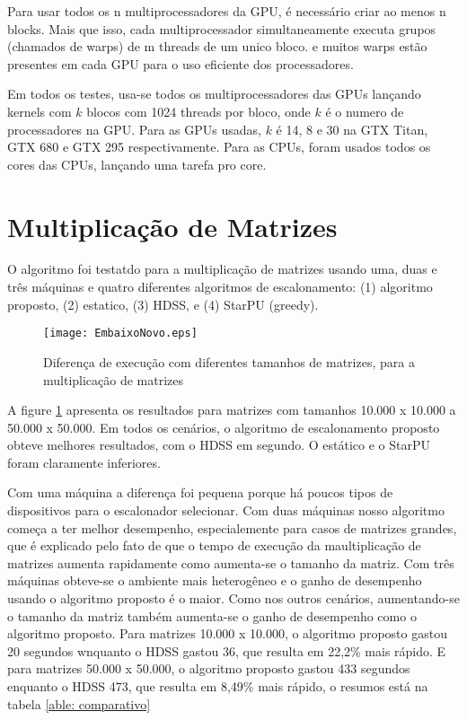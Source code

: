 Para usar todos os n multiprocessadores da GPU, é necessário criar ao menos n blocks. Mais que isso, cada multiprocessador simultaneamente executa grupos (chamados de warps) de m threads de um unico bloco. e muitos warps estão presentes em cada GPU para o uso eficiente dos processadores.

Em todos os testes, usa-se todos os multiprocessadores das GPUs lançando kernels com $k$ blocos com 1024 threads por bloco, onde $k$ é o numero de processadores na GPU. Para as GPUs usadas, $k$ é 14, 8 e 30 na GTX Titan, GTX 680 e GTX 295 respectivamente. Para as CPUs, foram usados todos os cores das CPUs, lançando uma tarefa pro core.

 \section{Multiplicação de Matrizes}

O algoritmo foi testatdo para a multiplicação de matrizes usando uma, duas e três máquinas e quatro diferentes algoritmos de escalonamento: (1) algoritmo proposto, (2) estatico, (3) HDSS, e (4) StarPU (greedy).

\begin{figure}[htb]
	\begin{center}
	\centering
			\texttt{[image: EmbaixoNovo.eps]}
	\caption{Diferença de execução com diferentes tamanhos de matrizes, para a multiplicação de matrizes}
	\label{fig:todosJuntos}
	\end{center}
\end{figure}

A figure \ref{fig:todosJuntos} apresenta os resultados para matrizes com tamanhos 10.000 x 10.000 a 50.000 x 50.000. Em todos os cenários, o algoritmo de escalonamento proposto obteve melhores resultados, com o HDSS em segundo. O estático e o StarPU foram claramente inferiores.

Com uma máquina a diferença foi pequena porque há poucos tipos de dispositivos para o escalonador selecionar. Com duas máquinas nosso algoritmo começa a ter melhor desempenho, especialemente para casos de matrizes grandes, que é explicado pelo fato de que o tempo de execução da maultiplicação de matrizes aumenta rapidamente como aumenta-se o tamanho da matriz. Com três máquinas obteve-se o ambiente mais heterogêneo e o ganho de desempenho usando o algoritmo proposto é o maior. Como nos outros cenários, aumentando-se o tamanho da matriz também aumenta-se o ganho de desempenho como o algoritmo proposto. Para matrizes 10.000 x 10.000, o algoritmo proposto gastou 20 segundos wnquanto o HDSS gastou 36, que resulta em 22,2\% mais rápido. E para matrizes 50.000 x 50.000, o algoritmo proposto gastou 433 segundos enquanto o HDSS 473, que resulta em 8,49\% mais rápido, o resumos está na tabela \ref{able: comparativo}

